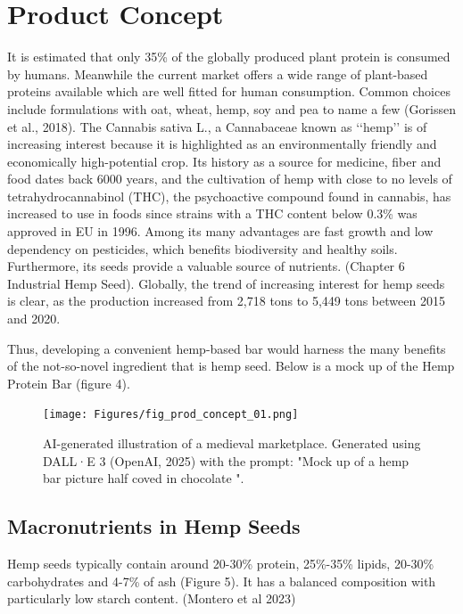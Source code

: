 \section{Product Concept}
It is estimated that only 35\% of the globally produced plant protein is consumed by humans. Meanwhile the current market offers a wide range of plant-based proteins available which are well fitted for human consumption. Common choices include formulations with oat, wheat, hemp, soy and pea to name a few (Gorissen et al., 2018). The Cannabis sativa L., a Cannabaceae known as ‘‘hemp’’ is of increasing interest because it is highlighted as an environmentally friendly and economically high-potential crop. Its history as a source for medicine, fiber and food dates back 6000 years, and the cultivation of hemp with close to no levels of tetrahydrocannabinol (THC), the psychoactive compound found in cannabis, has increased to use in foods since strains with a THC content below 0.3\% was approved in EU in 1996. Among its many advantages are fast growth and low dependency on pesticides, which benefits biodiversity and healthy soils. Furthermore, its seeds provide a valuable source of nutrients. (Chapter 6 Industrial Hemp Seed). Globally, the trend of increasing interest for hemp seeds is clear, as the production increased from 2,718 tons to 5,449 tons between 2015 and 2020. 

\vspace{1em}
Thus, developing a convenient hemp-based bar would harness the many benefits of the not-so-novel ingredient that is hemp seed. Below is a mock up of the Hemp Protein Bar (figure 4).

\begin{figure}[H]
    \centering
    \texttt{[image: Figures/fig\_prod\_concept\_01.png]}
    \caption{AI-generated illustration of a medieval marketplace. Generated using DALL·E 3 (OpenAI, 2025) with the prompt: "Mock up of a hemp bar picture half coved in chocolate ".}
    \label{fig:prod_concept_01}
\end{figure}


\subsection{Macronutrients in Hemp Seeds}
Hemp seeds typically contain around 20-30\% protein, 25\%-35\% lipids, 20-30\% carbohydrates and 4-7\% of ash (Figure 5). It has a balanced composition with particularly low starch content. (Montero et al 2023) 

